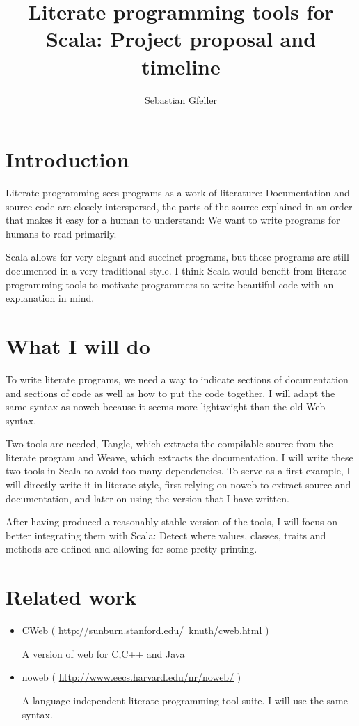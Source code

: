 \documentclass[a4paper,12pt]{article}
\title{Literate programming tools for Scala: Project proposal and timeline}
\author{Sebastian Gfeller}
\begin{document}
\maketitle
\section{Introduction}
Literate programming sees programs as a work of literature: Documentation and
source code are closely interspersed, the parts of the source explained in
an order that makes it easy for a human to understand: We want to write
programs for humans to read primarily.

Scala allows for very elegant and succinct programs, but these programs are
still documented in a very traditional style. I think Scala would benefit
from literate programming tools to motivate programmers to write beautiful
code with an explanation in mind.

\section{What I will do}
To write literate programs, we need a way to indicate sections of documentation
and sections of code as well as how to put the code together. I will adapt
the same syntax as noweb because it seems more lightweight than the old
Web syntax.

Two tools are needed, Tangle, which extracts the compilable source from
the literate program and Weave, which extracts the documentation. I will write
these two tools in Scala to avoid too many dependencies. To serve as a first
example, I will directly write it in literate style, first relying on
noweb to extract source and documentation, and later on using the version
that I have written.

After having produced a reasonably stable version of the tools, I will
focus on better integrating them with Scala: Detect where values, classes,
traits and methods are defined and allowing for some pretty printing.

\section{Related work}
\begin{itemize}
\item CWeb ( \href{http://sunburn.stanford.edu/~knuth/cweb.html}{http://sunburn.stanford.edu/~knuth/cweb.html} )

A version of web for C,C++ and Java

\item noweb ( \href{http://www.eecs.harvard.edu/nr/noweb/}{http://www.eecs.harvard.edu/nr/noweb/} )

A language-independent literate programming tool suite. I will use the same
syntax.

\end{itemize}
\end{document}
